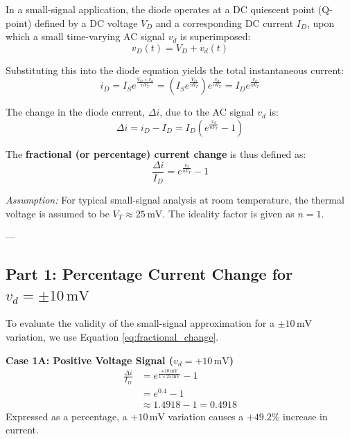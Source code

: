 \documentclass[12pt,a3paper]{article}
\begin{document}
\begin{enumerate}
\begin{tcolorbox}[enhanced,breakable,ansbox,colback=cA!4,colframe=cA,boxrule=0.8pt,arc=5pt,title={\textbf{Answer}},fonttitle=\bfseries\color{white},colbacktitle=cA]
In a small-signal application, the diode operates at a DC quiescent point (Q-point) defined by a DC voltage $V_D$ and a corresponding DC current $I_D$, upon which a small time-varying AC signal $v_d$ is superimposed:
\begin{equation}
    v_D(t) = V_D + v_d(t)
\end{equation}

Substituting this into the diode equation yields the total instantaneous current:
\begin{equation}
    i_D = I_S e^{\frac{V_D + v_d}{n V_T}} = \left( I_S e^{\frac{V_D}{n V_T}} \right) e^{\frac{v_d}{n V_T}} = I_D e^{\frac{v_d}{n V_T}}
\end{equation}

The change in the diode current, $\Delta i$, due to the AC signal $v_d$ is:
\begin{equation}
    \Delta i = i_D - I_D = I_D \left( e^{\frac{v_d}{n V_T}} - 1 \right)
\end{equation}

The \textbf{fractional (or percentage) current change} is thus defined as:
\begin{equation}
    \frac{\Delta i}{I_D} = e^{\frac{v_d}{n V_T}} - 1
    \label{eq:fractional_change}
\end{equation}

\textit{Assumption:} For typical small-signal analysis at room temperature, the thermal voltage is assumed to be $V_T \approx 25\,\text{mV}$. The ideality factor is given as $n=1$.

---

\subsection*{Part 1: Percentage Current Change for $v_d = \pm 10\,\text{mV}$}

To evaluate the validity of the small-signal approximation for a $\pm 10\,\text{mV}$ variation, we use Equation \eqref{eq:fractional_change}. 

\textbf{Case 1A: Positive Voltage Signal ($v_d = +10\,\text{mV}$)}
\begin{align}
    \frac{\Delta i}{I_D} &= e^{\frac{+10\,\text{mV}}{1 \times 25\,\text{mV}}} - 1 \\
    &= e^{0.4} - 1 \\
    &\approx 1.4918 - 1 = 0.4918
\end{align}
Expressed as a percentage, a $+10\,\text{mV}$ variation causes a \textbf{$+49.2\%$} increase in current.


\end{tcolorbox}
\end{enumerate}
\end{document}
